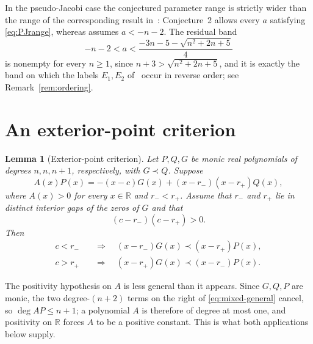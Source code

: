 \documentclass[11pt]{amsart}
\newtheorem{lemma}[theorem]{Lemma}
\theoremstyle{remark}
\newcommand{\R}{\mathbb{R}}
\begin{document}
In the pseudo-Jacobi case the conjectured parameter range is strictly wider than
the range of the corresponding result in~\cite{JordaanKumar}: Conjecture~2
allows every $a$ satisfying \eqref{eq:PJrange}, whereas
\cite[Corollary~6.1]{JordaanKumar} assumes $a<-n-2$.  The residual band
\[
 -n-2<a<\frac{-3n-5-\sqrt{n^2+2n+5}}4
\]
is nonempty for every $n\ge1$, since $n+3>\sqrt{n^2+2n+5}$, and it is exactly
the band on which the labels $E_1,E_2$ of~\cite{JordaanKumar} occur in reverse
order; see Remark~\ref{rem:ordering}.

\section{An exterior-point criterion}

\begin{lemma}[Exterior-point criterion]\label{lem:criterion}
Let $P,Q,G$ be monic real polynomials of degrees $n,n,n+1$, respectively, with
$G\prec Q$.  Suppose
\begin{equation}\label{eq:mixed-general}
 A(x)P(x)=-(x-c)G(x)+(x-r_-)(x-r_+)Q(x),
\end{equation}
where $A(x)>0$ for every $x\in\R$ and $r_-<r_+$.  Assume that $r_-$ and $r_+$
lie in distinct interior gaps of the zeros of $G$ and that
\[
 (c-r_-)(c-r_+)>0.
\]
Then
\begin{align*}
 c<r_-&\quad\Longrightarrow\quad
 (x-r_-)G(x)\prec(x-r_+)P(x),\\
 c>r_+&\quad\Longrightarrow\quad
 (x-r_+)G(x)\prec(x-r_-)P(x).
\end{align*}
\end{lemma}

The positivity hypothesis on $A$ is less general than it appears.  Since
$G,Q,P$ are monic, the two degree-$(n+2)$ terms on the right of
\eqref{eq:mixed-general} cancel, so $\deg AP\le n+1$; a polynomial $A$ is
therefore of degree at most one, and positivity on $\R$ forces $A$ to be a
positive constant.  This is what both applications below supply.
\end{document}
